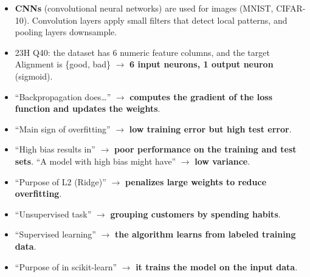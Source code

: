\begin{itemize}
\begin{itemize}
    \item {} sets the optimizer, loss and metrics;
    \item {} trains it;
    \item {} and  test and use it.
  \end{itemize}
  \item \textbf{CNNs} (convolutional neural networks) are used for images (MNIST, CIFAR-10). Convolution layers apply small filters that detect local patterns, and pooling layers downsample.
\end{itemize}
\begin{exam}
\begin{itemize}
  \item 23H Q40: the dataset has 6 numeric feature columns, and the target Alignment is \{good, bad\} $\to$ \textbf{6 input neurons, 1 output neuron} (sigmoid).
  \item ``Backpropagation does\dots'' $\to$ \textbf{computes the gradient of the loss function and updates the weights}.
  \item ``Main sign of overfitting'' $\to$ \textbf{low training error but high test error}.
  \item ``High bias results in'' $\to$ \textbf{poor performance on the training and test sets}. ``A model with high bias might have'' $\to$ \textbf{low variance}.
  \item ``Purpose of L2 (Ridge)'' $\to$ \textbf{penalizes large weights to reduce overfitting}.
  \item ``Unsupervised task'' $\to$ \textbf{grouping customers by spending habits}.
  \item ``Supervised learning'' $\to$ \textbf{the algorithm learns from labeled training data}.
  \item ``Purpose of  in scikit-learn'' $\to$ \textbf{it trains the model on the input data}.
\end{itemize}
\end{exam}
